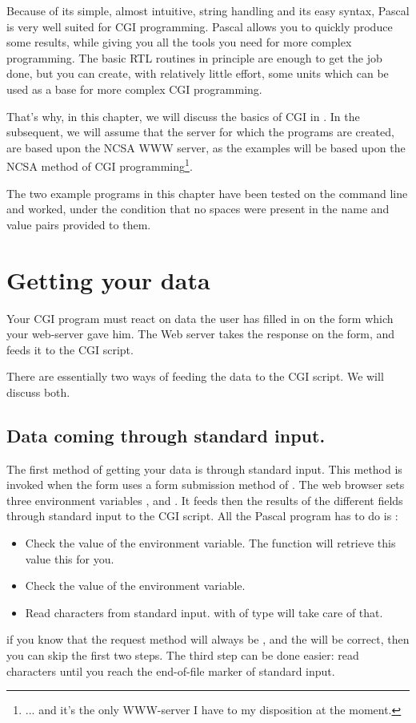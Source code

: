\documentclass{report}
\begin{document}
Because of its simple, almost intuitive, string handling and its easy syntax, 
Pascal is very well suited for CGI programming. Pascal allows you to quickly
produce some results, while giving you all the tools you need for more
complex programming. The basic RTL routines in principle are enough to get
the job done, but you can create, with relatively little effort, some units
which can be used as a base for more complex CGI programming.

That's why, in this chapter, we will discuss the basics of CGI in \fpc.
In the subsequent, we will assume that the server for which the programs are 
created, are based upon the NCSA  WWW server, as the examples
will be based upon the NCSA method of CGI programming\footnote{... and it's 
the only WWW-server I have to my disposition at the moment.}.

The two example programs in this chapter have been tested on the command line 
and worked, under the condition that no spaces were present in the name and 
value pairs provided to them.

\section{Getting your data}
Your CGI program must react on data the user has filled in on the form which
your web-server gave him. The Web server takes the response on the form, and
feeds it to the CGI script.

There are essentially two ways of feeding the data to the CGI script. We will
discuss both.

%
%

\subsection{Data coming through standard input.}
The first method of getting your data is through standard input. This method
is invoked when the form uses a form submission method of .
The web browser sets three environment variables ,
 and . It feeds then the results of
the different fields through standard input to the CGI script.
All the Pascal program has to do is :
\begin{itemize}
\item Check the value of the  environment variable. The
 function will retrieve this value this for you.
\item Check the value of the  environment variable.
\item Read  characters from standard input.  with  of type  will take care of that.
\end{itemize}
if you know that the request method will always be , and the
 will be correct, then you can skip the first two steps.
The third step can be done easier: read characters until you reach the
end-of-file marker of standard input.
\end{document}
